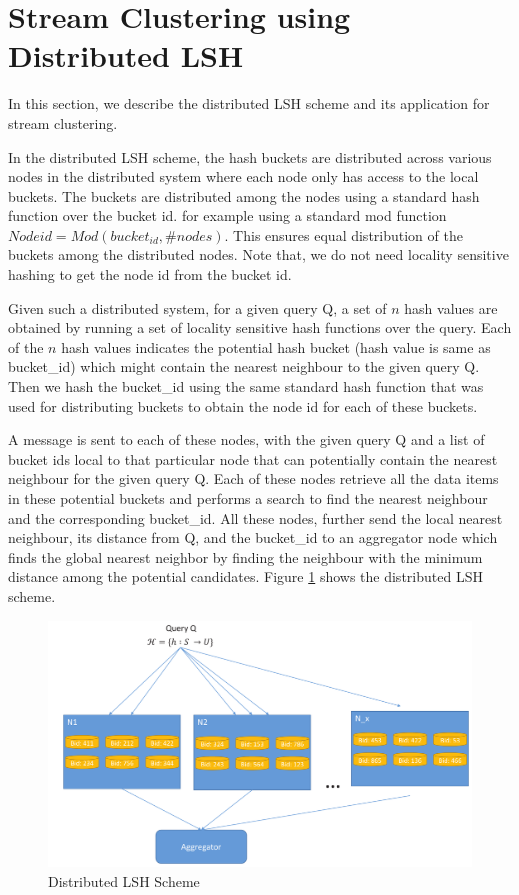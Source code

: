 \documentclass{article} %
\newcommand{\floe}{\emph{Floe }}
\begin{document}

\section{Stream Clustering using Distributed LSH}
\label{sec:design}
In this section, we describe the distributed LSH scheme and its application for stream clustering.

In the distributed LSH scheme, the hash buckets are distributed across various nodes in the distributed system where each node only has access to the local buckets. The buckets are distributed among the nodes using a standard hash function over the bucket id. for example using a standard mod function $Node id = Mod(bucket_{id}, \#nodes)$. This ensures equal distribution of the buckets among the distributed nodes. Note that, we do not need locality sensitive hashing to get the node id from the bucket id.

Given such a distributed system, for a given query Q, a set of $n$ hash values are obtained by running a set of locality sensitive hash functions over the query. Each of the $n$ hash values indicates the potential hash bucket (hash value is same as bucket\_id) which might contain the nearest neighbour to the given query Q. Then we hash the bucket\_id using the same standard hash function that was used for distributing buckets to obtain the node id for each of these buckets.

A message is sent to each of these nodes, with the given query Q and a list of bucket ids local to that particular node that can potentially contain the nearest neighbour for the given query Q. Each of these nodes retrieve all the data items in these potential buckets and performs a search to find the nearest neighbour and the corresponding bucket\_id. All these nodes, further send the local nearest neighbour, its distance from Q, and the bucket\_id to an aggregator node which finds the global nearest neighbor by finding the neighbour with the minimum distance among the potential candidates. Figure \ref{fig:dlsh} shows the distributed LSH scheme. 


\begin{figure}
\centering
\includegraphics[width=0.8\columnwidth]{distributeLSH.pdf}
\caption{Distributed LSH Scheme}
\label{fig:dlsh}
\end{figure}
\end{document}
